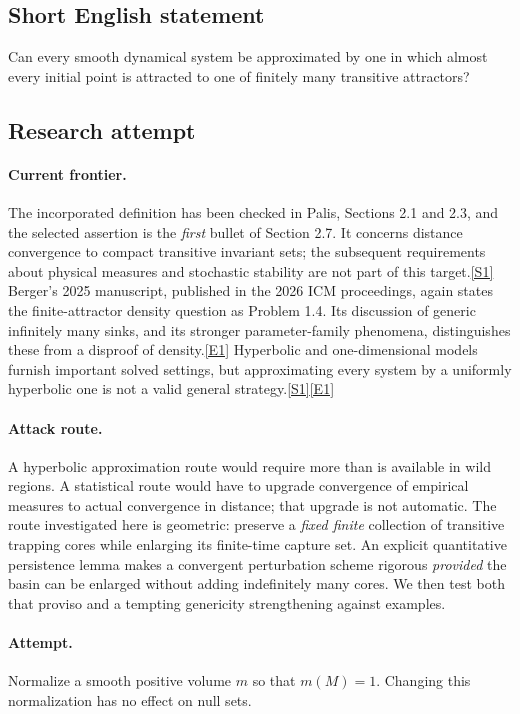 \documentclass[11pt,a4paper]{article}
\newcommand{\sref}[2]{\hyperlink{source:#1:#2}{[S#2]}}
\newcommand{\eref}[2]{\hyperlink{extra:#1:#2}{[E#2]}}
\begin{document}
\subsection{Short English statement}
Can every smooth dynamical system be approximated by one in which almost every initial point is attracted to one of finitely many transitive attractors?
\subsection{Research attempt}

\paragraph{Current frontier.}
The incorporated definition has been checked in Palis, Sections 2.1 and
2.3, and the selected assertion is the \emph{first} bullet of Section 2.7.
It concerns distance convergence to compact transitive invariant sets;
the subsequent requirements about physical measures and stochastic
stability are not part of this target.\sref{3433}{1}
Berger's 2025 manuscript, published in the 2026 ICM proceedings, again
states the finite-attractor density question as Problem 1.4. Its discussion
of generic infinitely many sinks, and its stronger parameter-family
phenomena, distinguishes these from a disproof of density.\eref{3433}{1}
Hyperbolic and one-dimensional models furnish important solved settings,
but approximating every system by a uniformly hyperbolic one is not a
valid general strategy.\sref{3433}{1}\eref{3433}{1}

\paragraph{Attack route.}
A hyperbolic approximation route would require more than is available in
wild regions. A statistical route would have to upgrade convergence of
empirical measures to actual convergence in distance; that upgrade is
not automatic. The route investigated here is geometric: preserve a
\emph{fixed finite} collection of transitive trapping cores while enlarging
its finite-time capture set. An explicit quantitative persistence lemma
makes a convergent perturbation scheme rigorous \emph{provided} the basin
can be enlarged without adding indefinitely many cores. We then test both
that proviso and a tempting genericity strengthening against examples.

\paragraph{Attempt.}
Normalize a smooth positive volume $m$ so that $m(M)=1$. Changing this
normalization has no effect on null sets.
\end{document}
